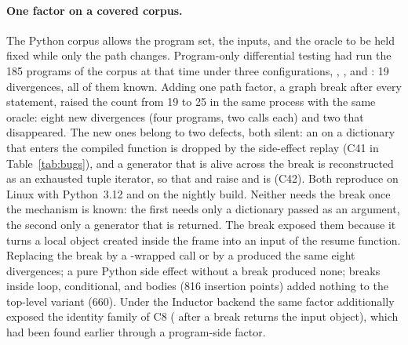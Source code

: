 \paragraph{One factor on a covered corpus.} The Python corpus allows the program set, the inputs, and the
oracle to be held fixed while only the path changes. Program-only
differential testing had run the 185 programs of the corpus at that time under three configurations,
, , and : 19 divergences, all of them known. Adding one path factor, a graph break after every
statement, raised the count from 19 to 25 in the same process with the same oracle: eight new divergences (four
programs, two calls each) and two that disappeared. The new ones belong to two defects, both silent: an  on a dictionary that enters
the compiled function is dropped by the side-effect replay (C41 in Table~\ref{tab:bugs}), and a generator
that is alive across the break is reconstructed as an exhausted tuple iterator, so that  and
 raise  and  is  (C42). Both
reproduce on Linux with Python~3.12 and on the nightly build. Neither needs the break once the mechanism is
known: the first needs only a dictionary passed as an argument, the second only a
generator that is returned. The break exposed them because it turns a local object created inside the frame into an input of the
resume function. Replacing the break by a -wrapped call or by a
 produced the same eight divergences; a pure Python side effect without a break produced none;
breaks inside loop, conditional, and  bodies (816 insertion points) added nothing to the top-level
variant (660). Under the Inductor backend the same factor additionally exposed the identity family of C8
( after a break returns the input object), which had been found earlier through a program-side
factor.


